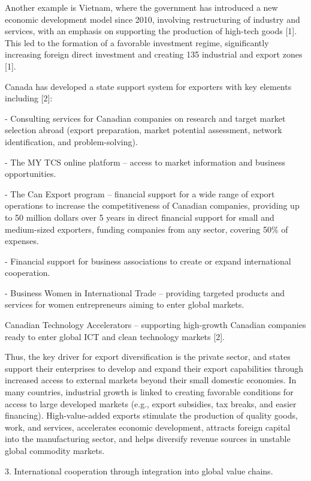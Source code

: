 Another example is Vietnam, where the government has introduced a new
economic development model since 2010, involving restructuring of
industry and services, with an emphasis on supporting the production of
high-tech goods {[}1{]}. This led to the formation of a favorable
investment regime, significantly increasing foreign direct investment
and creating 135 industrial and export zones {[}1{]}.

Canada has developed a state support system for exporters with key
elements including {[}2{]}:

- Consulting services for Canadian companies on research and target
market selection abroad (export preparation, market potential
assessment, network identification, and problem-solving).

- The MY TCS online platform -- access to market information and
business opportunities.

- The Can Export program -- financial support for a wide range of export
operations to increase the competitiveness of Canadian companies,
providing up to 50 million dollars over 5 years in direct financial
support for small and medium-sized exporters, funding companies from any
sector, covering 50\% of expenses.

- Financial support for business associations to create or expand
international cooperation.

- Business Women in International Trade -- providing targeted products
and services for women entrepreneurs aiming to enter global markets.

Canadian Technology Accelerators -- supporting high-growth Canadian
companies ready to enter global ICT and clean technology markets
{[}2{]}.

Thus, the key driver for export diversification is the private sector,
and states support their enterprises to develop and expand their export
capabilities through increased access to external markets beyond their
small domestic economies. In many countries, industrial growth is linked
to creating favorable conditions for access to large developed markets
(e.g., export subsidies, tax breaks, and easier financing).
High-value-added exports stimulate the production of quality goods,
work, and services, accelerates economic development, attracts foreign
capital into the manufacturing sector, and helps diversify revenue
sources in unstable global commodity markets.

3. International cooperation through integration into global value
chains.

